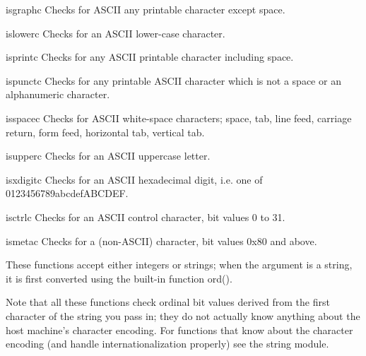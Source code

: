 \begin{funcdesc}{isgraph}{c}
Checks for ASCII any printable character except space.
\end{funcdesc}

\begin{funcdesc}{islower}{c}
Checks for an ASCII lower-case character.
\end{funcdesc}

\begin{funcdesc}{isprint}{c}
Checks for any ASCII printable character including space.
\end{funcdesc}

\begin{funcdesc}{ispunct}{c}
Checks for any printable ASCII character which is not a space or an
alphanumeric character.
\end{funcdesc}

\begin{funcdesc}{isspace}{c}
Checks for ASCII white-space characters; space, tab, line feed,
carriage return, form feed, horizontal tab, vertical tab.
\end{funcdesc}

\begin{funcdesc}{isupper}{c}
Checks for an ASCII uppercase letter.
\end{funcdesc}

\begin{funcdesc}{isxdigit}{c}
Checks for an ASCII hexadecimal digit, i.e. one of 0123456789abcdefABCDEF.
\end{funcdesc}

\begin{funcdesc}{isctrl}{c}
Checks for an ASCII control character, bit values 0 to 31.
\end{funcdesc}

\begin{funcdesc}{ismeta}{c}
Checks for a (non-ASCII) character, bit values 0x80 and above.
\end{funcdesc}

These functions accept either integers or strings; when the argument
is a string, it is first converted using the built-in function ord().

Note that all these functions check ordinal bit values derived from the 
first character of the string you pass in; they do not actually know
anything about the host machine's character encoding.  For functions 
that know about the character encoding (and handle
internationalization properly) see the string module.


